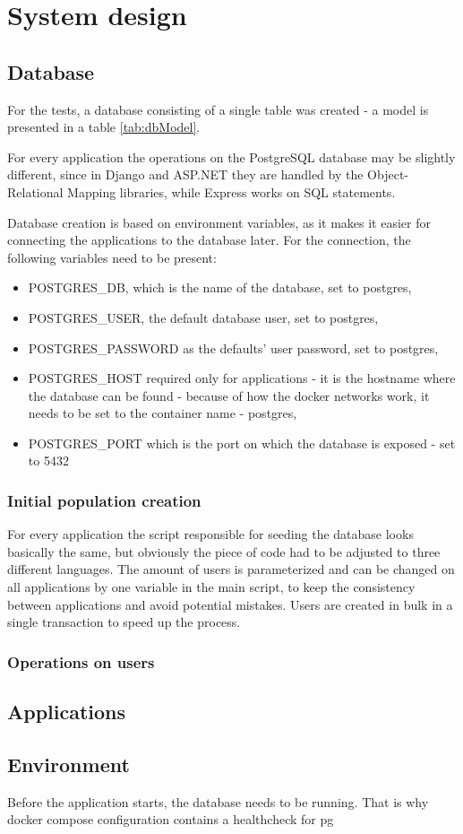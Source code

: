 
\chapter{System design}

\section{Database}

For the tests, a database consisting of a single table was created - a model is presented in a table \ref{tab:dbModel}.



For every application the operations on the PostgreSQL database may be slightly different, since in Django and ASP.NET they are handled by the Object-Relational Mapping libraries, while Express works on SQL statements.

Database creation is based on environment variables, as it makes it easier for connecting the applications to the database later. For the connection, the following variables need to be present:
\begin{itemize}
    \item POSTGRES\_DB, which is the name of the database, set to postgres,
    \item POSTGRES\_USER, the default database user, set to postgres,
    \item POSTGRES\_PASSWORD as the defaults' user password, set to postgres,
    \item POSTGRES\_HOST required only for applications - it is the hostname where the database can be found - because of how the docker networks work, it needs to be set to the container name - postgres,
    \item POSTGRES\_PORT which is the port on which the database is exposed - set to 5432
\end{itemize}

\subsection{Initial population creation}

For every application the script responsible for seeding the database looks basically the same, but obviously the piece of code had to be adjusted to three different languages. The amount of users is parameterized and can be changed on all applications by one variable in the main script, to keep the consistency between applications and avoid potential mistakes. Users are created in bulk in a single transaction to speed up the process.

\subsection{Operations on users}

\section{Applications}
\section{Environment}

Before the application starts, the database needs to be running. That is why docker compose configuration contains a healthcheck for \acrshort{pg}
